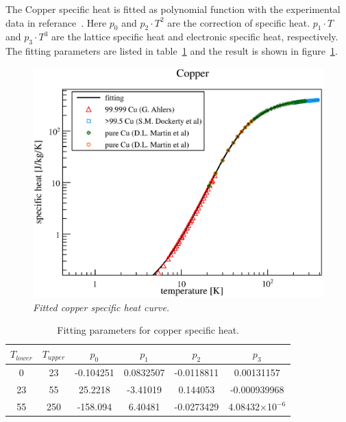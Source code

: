 The Copper specific heat is fitted as polynomial function with the experimental data in referance~\cite{aldata}.
Here $p_0$ and $p_2 \cdot T^2$ are the correction of specific heat.
$p_1 \cdot T$ and $p_3 \cdot T^3$ are the lattice specific heat and electronic specific heat, respectively.
The fitting parameters are listed in table~\ref{cufit} and the result is shown in figure~\ref{4cush}.
\begin{figure}[H]
   \centering
   \includegraphics[scale=0.45]{chapter5/fig/cush.eps}
   \caption{\it Fitted copper specific heat curve.}
   \label{4cush}
  \end{figure}
\begin{table}[H]
 \centering
 \begin{tabular}{cccccc} \hline \hline
  $T_{lower}$ & $T_{upper}$ & $p_0$ & $p_1$ & $p_2$ & $p_3$ \\ \hline
  0 & 23 & -0.104251 & 0.0832507 & -0.0118811 & 0.00131157 \\
  23 & 55 & 25.2218 & -3.41019 & 0.144053 & -0.000939968 \\
  55 & 250 & -158.094 & 6.40481 & -0.0273429 & 4.08432$\times$10$^{-6}$ \\ \hline \hline
 \end{tabular}
 \caption{Fitting parameters for copper specific heat.}
 \label{cufit}
\end{table}

